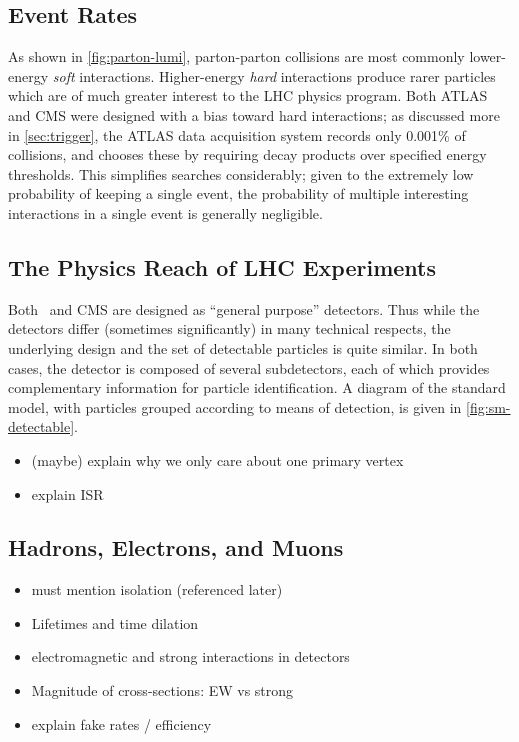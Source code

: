 \subsection{Event Rates}
As shown in \cref{fig:parton-lumi}, parton-parton collisions are most commonly lower-energy \emph{soft} interactions.
Higher-energy \emph{hard} interactions produce rarer particles which are of much greater interest to the LHC physics program.
Both ATLAS and CMS were designed with a bias toward hard interactions; as discussed more in \cref{sec:trigger}, the ATLAS data acquisition system records only 0.001\% of collisions, and chooses these by requiring decay products over specified energy thresholds.
This simplifies searches considerably; given to the extremely low probability of keeping a single event, the probability of multiple interesting interactions in a single event is generally negligible.


\subsection{The Physics Reach of LHC Experiments}
Both \atlas\ and CMS are designed as ``general purpose'' detectors.
Thus while the detectors differ (sometimes significantly) in many technical respects, the underlying design and the set of detectable particles is quite similar.
In both cases, the detector is composed of several subdetectors, each of which provides complementary information for particle identification.
A diagram of the standard model, with particles grouped according to means of detection, is given in \cref{fig:sm-detectable}.


\begin{itemize}
\item (maybe) explain why we only care about one primary vertex
\item explain ISR
\end{itemize}
\subsection{Hadrons, Electrons, and Muons}
\begin{itemize}
\item must mention isolation (referenced later)
\item Lifetimes and time dilation
\item electromagnetic and strong interactions in detectors
\item Magnitude of cross-sections: EW vs strong
\item explain fake rates / efficiency
\end{itemize}
